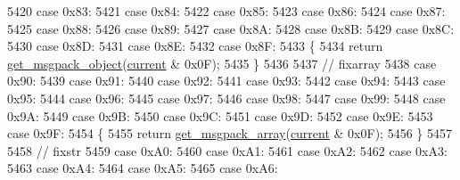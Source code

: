 \begin{DoxyCode}
5420             \textcolor{keywordflow}{case} 0x83:
5421             \textcolor{keywordflow}{case} 0x84:
5422             \textcolor{keywordflow}{case} 0x85:
5423             \textcolor{keywordflow}{case} 0x86:
5424             \textcolor{keywordflow}{case} 0x87:
5425             \textcolor{keywordflow}{case} 0x88:
5426             \textcolor{keywordflow}{case} 0x89:
5427             \textcolor{keywordflow}{case} 0x8A:
5428             \textcolor{keywordflow}{case} 0x8B:
5429             \textcolor{keywordflow}{case} 0x8C:
5430             \textcolor{keywordflow}{case} 0x8D:
5431             \textcolor{keywordflow}{case} 0x8E:
5432             \textcolor{keywordflow}{case} 0x8F:
5433             \{
5434                 \textcolor{keywordflow}{return} \hyperlink{classnlohmann_1_1detail_1_1binary__reader_a8fd9972d8bbb03b49acbaaf641151859}{get\_msgpack\_object}(\hyperlink{classnlohmann_1_1detail_1_1binary__reader_a7e994e201b215cd6d6ae28a1853f43e0}{current} & 0x0F);
5435             \}
5436 
5437             \textcolor{comment}{// fixarray}
5438             \textcolor{keywordflow}{case} 0x90:
5439             \textcolor{keywordflow}{case} 0x91:
5440             \textcolor{keywordflow}{case} 0x92:
5441             \textcolor{keywordflow}{case} 0x93:
5442             \textcolor{keywordflow}{case} 0x94:
5443             \textcolor{keywordflow}{case} 0x95:
5444             \textcolor{keywordflow}{case} 0x96:
5445             \textcolor{keywordflow}{case} 0x97:
5446             \textcolor{keywordflow}{case} 0x98:
5447             \textcolor{keywordflow}{case} 0x99:
5448             \textcolor{keywordflow}{case} 0x9A:
5449             \textcolor{keywordflow}{case} 0x9B:
5450             \textcolor{keywordflow}{case} 0x9C:
5451             \textcolor{keywordflow}{case} 0x9D:
5452             \textcolor{keywordflow}{case} 0x9E:
5453             \textcolor{keywordflow}{case} 0x9F:
5454             \{
5455                 \textcolor{keywordflow}{return} \hyperlink{classnlohmann_1_1detail_1_1binary__reader_a7adeb751743afe4233d75d351252bc93}{get\_msgpack\_array}(\hyperlink{classnlohmann_1_1detail_1_1binary__reader_a7e994e201b215cd6d6ae28a1853f43e0}{current} & 0x0F);
5456             \}
5457 
5458             \textcolor{comment}{// fixstr}
5459             \textcolor{keywordflow}{case} 0xA0:
5460             \textcolor{keywordflow}{case} 0xA1:
5461             \textcolor{keywordflow}{case} 0xA2:
5462             \textcolor{keywordflow}{case} 0xA3:
5463             \textcolor{keywordflow}{case} 0xA4:
5464             \textcolor{keywordflow}{case} 0xA5:
5465             \textcolor{keywordflow}{case} 0xA6:

\end{DoxyCode}
